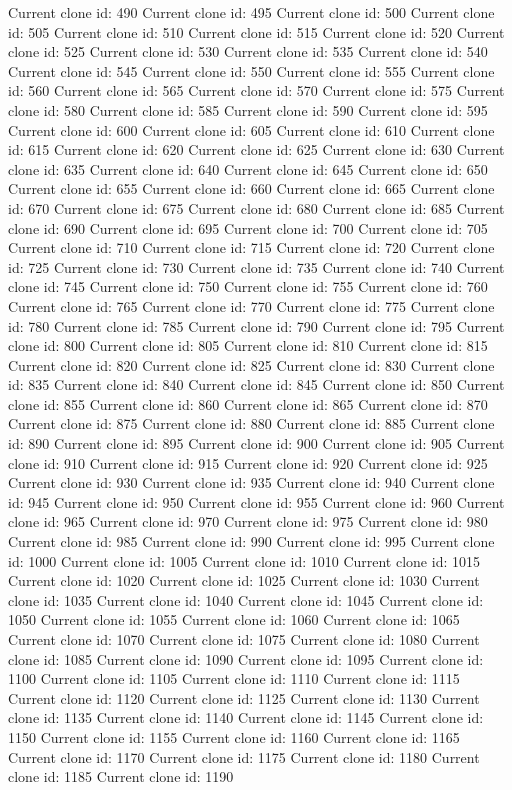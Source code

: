\documentclass[letterpaper,10pt,english]{sphinxmanual}
\begin{document}
{\begin{sphinxVerbatim}[commandchars=\\\{\}]
Current clone id: 490
Current clone id: 495
Current clone id: 500
Current clone id: 505
Current clone id: 510
Current clone id: 515
Current clone id: 520
Current clone id: 525
Current clone id: 530
Current clone id: 535
Current clone id: 540
Current clone id: 545
Current clone id: 550
Current clone id: 555
Current clone id: 560
Current clone id: 565
Current clone id: 570
Current clone id: 575
Current clone id: 580
Current clone id: 585
Current clone id: 590
Current clone id: 595
Current clone id: 600
Current clone id: 605
Current clone id: 610
Current clone id: 615
Current clone id: 620
Current clone id: 625
Current clone id: 630
Current clone id: 635
Current clone id: 640
Current clone id: 645
Current clone id: 650
Current clone id: 655
Current clone id: 660
Current clone id: 665
Current clone id: 670
Current clone id: 675
Current clone id: 680
Current clone id: 685
Current clone id: 690
Current clone id: 695
Current clone id: 700
Current clone id: 705
Current clone id: 710
Current clone id: 715
Current clone id: 720
Current clone id: 725
Current clone id: 730
Current clone id: 735
Current clone id: 740
Current clone id: 745
Current clone id: 750
Current clone id: 755
Current clone id: 760
Current clone id: 765
Current clone id: 770
Current clone id: 775
Current clone id: 780
Current clone id: 785
Current clone id: 790
Current clone id: 795
Current clone id: 800
Current clone id: 805
Current clone id: 810
Current clone id: 815
Current clone id: 820
Current clone id: 825
Current clone id: 830
Current clone id: 835
Current clone id: 840
Current clone id: 845
Current clone id: 850
Current clone id: 855
Current clone id: 860
Current clone id: 865
Current clone id: 870
Current clone id: 875
Current clone id: 880
Current clone id: 885
Current clone id: 890
Current clone id: 895
Current clone id: 900
Current clone id: 905
Current clone id: 910
Current clone id: 915
Current clone id: 920
Current clone id: 925
Current clone id: 930
Current clone id: 935
Current clone id: 940
Current clone id: 945
Current clone id: 950
Current clone id: 955
Current clone id: 960
Current clone id: 965
Current clone id: 970
Current clone id: 975
Current clone id: 980
Current clone id: 985
Current clone id: 990
Current clone id: 995
Current clone id: 1000
Current clone id: 1005
Current clone id: 1010
Current clone id: 1015
Current clone id: 1020
Current clone id: 1025
Current clone id: 1030
Current clone id: 1035
Current clone id: 1040
Current clone id: 1045
Current clone id: 1050
Current clone id: 1055
Current clone id: 1060
Current clone id: 1065
Current clone id: 1070
Current clone id: 1075
Current clone id: 1080
Current clone id: 1085
Current clone id: 1090
Current clone id: 1095
Current clone id: 1100
Current clone id: 1105
Current clone id: 1110
Current clone id: 1115
Current clone id: 1120
Current clone id: 1125
Current clone id: 1130
Current clone id: 1135
Current clone id: 1140
Current clone id: 1145
Current clone id: 1150
Current clone id: 1155
Current clone id: 1160
Current clone id: 1165
Current clone id: 1170
Current clone id: 1175
Current clone id: 1180
Current clone id: 1185
Current clone id: 1190
\end{sphinxVerbatim}
}
\end{document}
